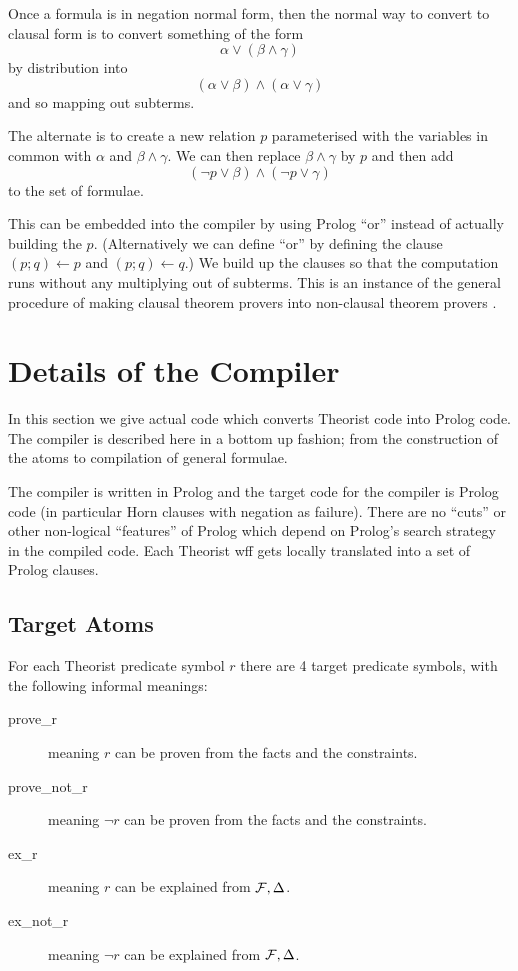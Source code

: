 Once a formula is in negation normal form, then the normal way 
to convert to clausal form \cite{chang} is to
convert something of the form
\[\alpha \vee (\beta \wedge \gamma)\]
by distribution into
\[(\alpha \vee \beta) \wedge (\alpha \vee \gamma)\]
and so mapping out subterms.

The alternate \cite{poole:clausal} is to create a new relation $p$ parameterised
with the variables in common with $\alpha$ and $\beta \wedge \gamma$.
We can then replace $\beta \wedge \gamma$ by $p$ and then add
\[(\neg p \vee \beta)\wedge (\neg p \vee \gamma)\]
to the set of formulae.

This can be embedded into the compiler by using
Prolog ``or'' instead of actually building the $p$. 
(Alternatively we can define ``or'' by defining the
clause $(p;q)\leftarrow p$ and $(p;q)\leftarrow q$.)
We build up the clauses so that the computation runs
without any multiplying out of subterms.
This is an instance of the general procedure of making clausal
theorem provers into non-clausal theorem provers \cite{poole:clausal}.
\section{Details of the Compiler}
In this section we give actual code which converts
Theorist code into Prolog code.
The compiler is described here in a bottom up fashion; from the
construction of the atoms to compilation of general formulae.

The compiler is written in Prolog and the
target code for the compiler is Prolog code (in particular Horn
clauses with negation as failure). There are no ``cuts'' or other
non-logical ``features'' of Prolog which depend on Prolog's
search strategy in the compiled code.
Each Theorist wff gets locally translated into a set of
Prolog clauses.
\subsection{Target Atoms}
For each Theorist predicate symbol $r$ there are 4 target predicate
symbols, with the following informal meanings:
\begin{description}
\item[prove\_r] meaning $r$ can be proven from the facts and the constraints.
\item[prove\_not\_r] meaning $\neg r$ can be proven from the facts 
and the constraints.
\item[ex\_r] meaning $r$ can be explained from ${\cal F},\Delta$.
\item[ex\_not\_r] meaning $\neg r$ can be explained from ${\cal F},\Delta$.
\end{description}

